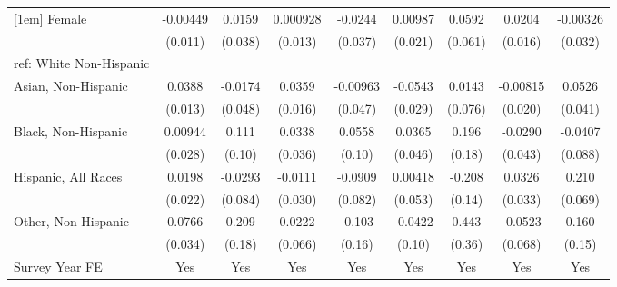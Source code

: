 \begin{table}[htbp]
\begin{tabular}{l*{8}{c}}
[1em]
Female&    -0.00449         &      0.0159         &    0.000928         &     -0.0244         &     0.00987         &      0.0592         &      0.0204         &    -0.00326         \\
  &     (0.011)         &     (0.038)         &     (0.013)         &     (0.037)         &     (0.021)         &     (0.061)         &     (0.016)         &     (0.032)         \\
[1em]
ref: White Non-Hispanic&                     &                     &                     &                     &                     &                     &                     &                     \\
[1em]
Asian, Non-Hispanic&      0.0388\sym{***}&     -0.0174         &      0.0359\sym{**} &    -0.00963         &     -0.0543\sym{*}  &      0.0143         &    -0.00815         &      0.0526         \\
  &     (0.013)         &     (0.048)         &     (0.016)         &     (0.047)         &     (0.029)         &     (0.076)         &     (0.020)         &     (0.041)         \\
[1em]
Black, Non-Hispanic&     0.00944         &       0.111         &      0.0338         &      0.0558         &      0.0365         &       0.196         &     -0.0290         &     -0.0407         \\
  &     (0.028)         &      (0.10)         &     (0.036)         &      (0.10)         &     (0.046)         &      (0.18)         &     (0.043)         &     (0.088)         \\
[1em]
Hispanic, All Races&      0.0198         &     -0.0293         &     -0.0111         &     -0.0909         &     0.00418         &      -0.208         &      0.0326         &       0.210\sym{***}\\
  &     (0.022)         &     (0.084)         &     (0.030)         &     (0.082)         &     (0.053)         &      (0.14)         &     (0.033)         &     (0.069)         \\
[1em]
Other, Non-Hispanic&      0.0766\sym{**} &       0.209         &      0.0222         &      -0.103         &     -0.0422         &       0.443         &     -0.0523         &       0.160         \\
  &     (0.034)         &      (0.18)         &     (0.066)         &      (0.16)         &      (0.10)         &      (0.36)         &     (0.068)         &      (0.15)         \\
[1em]
Survey Year FE&         Yes         &         Yes         &         Yes         &         Yes         &         Yes         &         Yes         &         Yes         &         Yes         \\

\end{tabular}
\end{table}
